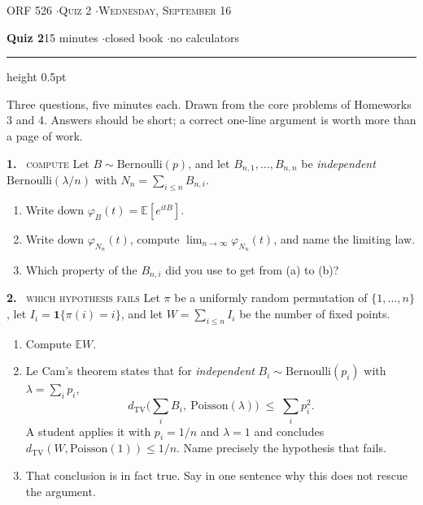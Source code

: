 \documentclass[11pt]{article}
\newcommand{\E}{\mathbb{E}}
\newcommand{\Poi}{\mathrm{Poisson}}
\newcommand{\Ber}{\mathrm{Bernoulli}}
\newcommand{\TV}{d_{\mathrm{TV}}}
\begin{document}
{\footnotesize\color{acc}\textsc{ORF 526 \quad$\cdot$\quad Quiz 2 \quad$\cdot$\quad Wednesday, September 16}}

\vspace{0.4em}
{\large\bfseries Quiz 2}\hfill {\color{grey}15 minutes \quad$\cdot$\quad closed book \quad$\cdot$\quad no calculators}

\vspace{0.5em}
\hrule height 0.5pt
\vspace{0.3em}

{\footnotesize\color{grey} Three questions, five minutes each. Drawn from the core problems of Homeworks 3 and 4. Answers should be short; a correct one-line argument is worth more than a page of work.}

\vspace{1.2em}

\textbf{1.} \ \textsc{\small compute} \quad Let $B\sim\Ber(p)$, and let $B_{n,1},\dots,B_{n,n}$ be \emph{independent} $\Ber(\lambda/n)$ with $N_n=\sum_{i\le n}B_{n,i}$.

\begin{enumerate}[label=(\alph*),leftmargin=1.8em,itemsep=0.3em,topsep=0.3em]
\item Write down $\varphi_B(t)=\E[e^{itB}]$.
\item Write down $\varphi_{N_n}(t)$, compute $\lim_{n\to\infty}\varphi_{N_n}(t)$, and name the limiting law.
\item Which property of the $B_{n,i}$ did you use to get from (a) to (b)?
\end{enumerate}

\vspace{1.5em}

\textbf{2.} \ \textsc{\small which hypothesis fails} \quad Let $\pi$ be a uniformly random permutation of $\{1,\dots,n\}$, let $I_i=\mathbf 1\{\pi(i)=i\}$, and let $W=\sum_{i\le n}I_i$ be the number of fixed points.

\begin{enumerate}[label=(\alph*),leftmargin=1.8em,itemsep=0.3em,topsep=0.3em]
\item Compute $\E W$.
\item Le Cam's theorem states that for \emph{independent} $B_i\sim\Ber(p_i)$ with $\lambda=\sum_ip_i$,
\[
\TV\Big(\sum_iB_i,\ \Poi(\lambda)\Big)\;\le\;\sum_ip_i^2 .
\]
A student applies it with $p_i=1/n$ and $\lambda=1$ and concludes $\TV(W,\Poi(1))\le 1/n$. Name precisely the hypothesis that fails.
\item That conclusion is in fact true. Say in one sentence why this does not rescue the argument.
\end{enumerate}
\end{document}
